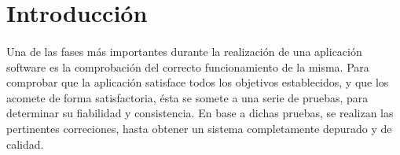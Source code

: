 \section{Introducción}

  \paragraph{}Una de las fases más importantes durante la realización de una
  aplicación software es la comprobación del correcto funcionamiento de la
  misma. Para comprobar que la aplicación satisface todos los objetivos
  establecidos, y que los acomete de forma satisfactoria, ésta se somete a una
  serie de pruebas, para determinar su fiabilidad y consistencia. En base a
  dichas pruebas, se realizan las pertinentes correciones, hasta obtener un
  sistema completamente depurado y de calidad.
